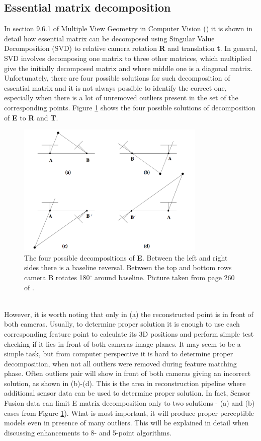 \subsection{Essential matrix decomposition}
In section 9.6.1 of Multiple View Geometry in Computer Vision (\cite{HartleyMultipleView}) it is shown in detail how essential matrix can be decomposed using Singular Value Decomposition (SVD) to relative camera rotation \textbf{R} and translation \textbf{t}. In general, SVD involves decomposing one matrix to three other matrices, which multiplied give the initially decomposed matrix and where middle one is a diagonal matrix. \\ 
Unfortunately, there are four possible solutions for such decomposition of essential matrix and it is not always possible to identify the correct one, especially when there is a lot of unremoved outliers present in the set of the corresponding points. Figure \ref{fig:fourAmbig} shows the four possible solutions of decomposition of \textbf{E} to \textbf{R} and \textbf{T}. 
\begin{figure}[h!]
    \centering
    \includegraphics[width=0.8\textwidth]{fourAmbig}
    \caption[The four possible decompositions of \textbf{E}]{The four possible decompositions of \textbf{E}. Between the left and right sides there is a baseline reversal. Between the top and bottom rows camera B rotates 180$^{\circ}$ around baseline. Picture taken from page 260 of \cite{HartleyMultipleView}.}
    \label{fig:fourAmbig}
\end{figure}
\\
However, it is worth noting that only in (a) the reconstructed point is in front of both cameras. Usually, to determine proper solution it is enough to use each corresponding feature point to calculate its 3D positions and perform simple test checking if it lies in front of both cameras image planes. It may seem to be a simple task, but from computer perspective it is hard to determine proper decomposition, when not all outliers were removed during feature matching phase. Often outliers pair will show in front of both cameras giving an incorrect solution, as shown in (b)-(d).
This is the area in reconstruction pipeline where additional sensor data can be used to determine proper solution. In fact, Sensor Fusion data can limit E matrix decomposition only to two solutions - (a) and (b) cases from Figure \ref{fig:fourAmbig}). What is most important, it will produce proper perceptible models even in presence of many outliers. This will be explained in detail when discussing enhancements to 8- and 5-point algorithms.
